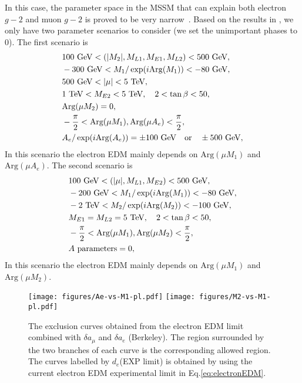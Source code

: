\documentclass[a4paper,11pt]{article}
\begin{document}
    In this case, the parameter space in the MSSM that can explain both electron $g-2$ and muon $g-2$ is proved to be very narrow~\cite{Badziak:2019gaf, Li:2021koa}. Based on the results in \cite{Badziak:2019gaf, Li:2021koa}, we only have two parameter scenarios to consider (we set the unimportant phases to $0$). The first scenario is~\cite{Badziak:2019gaf}
   \begin{align*}
       & 100~\text{GeV}<(|M_2|,M_{L1},M_{E1},M_{L2})<500~\text{GeV}, \\
       &-300~\text{GeV}<M_1/\exp(i{\rm Arg}(M_1))<-80~\text{GeV},\\
       & 500~\text{GeV}<|\mu|<5~\text{TeV},\\
       &1~\text{TeV}<M_{E2}<5~\text{TeV},\quad 2<\tan\beta <50,\\
       &\text{Arg}(\mu M_2)=0,\\
       &-\frac{\pi}{2}<\text{Arg}(\mu M_1),\text{Arg}(\mu A_e)<\frac{\pi}{2},\\
       &A_e/\exp(i{\rm Arg}(A_e))=\pm 100~{\rm GeV}\quad \text{or}\quad \pm500~{\rm GeV},
   \end{align*}
   In this scenario the electron EDM mainly depends on $\text{Arg}(\mu M_1)$ and $\text{Arg}(\mu A_e)$. The second scenario is~\cite{Li:2021koa}
   \begin{align*}
       & 100~\text{GeV}<(|\mu|,M_{L1},M_{E2})<500~\text{GeV}, \\
       &-200~\text{GeV}<M_1/\exp(i{\rm Arg}(M_1))<-80~\text{GeV},\\ 
       & -2~\text{TeV}<M_2/\exp(i{\rm Arg}(M_2))<-100~\text{GeV},\\
       &M_{E1}=M_{L2}=5~\text{TeV},\quad 2<\tan\beta <50,\\
       &-\frac{\pi}{2}<\text{Arg}(\mu M_1),\text{Arg}(\mu M_2)<\frac{\pi}{2},\\
       &A\text{ parameters} = 0,
   \end{align*}
    In this scenario the electron EDM mainly depends on $\text{Arg}(\mu M_1)$ and $\text{Arg}(\mu M_2)$.
   
   \begin{figure}[ht]
      \centering %
      \texttt{[image: figures/Ae-vs-M1-pl.pdf]}
      \hfill
      \texttt{[image: figures/M2-vs-M1-pl.pdf]}
      \caption{\label{fig:non-universality} 
      The exclusion curves obtained from the electron EDM limit combined with $\delta a_{\mu}$ and $\delta a_e$ (Berkeley). The region surrounded by the two branches of each curve is the corresponding allowed region. The curves labelled by $d_e$(EXP limit) is obtained by using the current electron EDM experimental limit in Eq.\eqref{eq:electronEDM}. }
   \end{figure}
   
\end{document}

